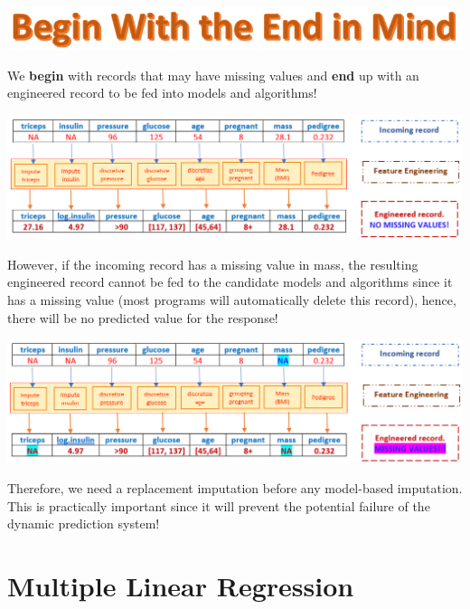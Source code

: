 \documentclass[
]{book}
\begin{document}
\begin{center}\includegraphics[width=0.4\linewidth]{img03/BeginWithEndInMind} \end{center}

\hfill\break

We \textbf{begin} with records that may have missing values and \textbf{end} up with an engineered record to be fed into models and algorithms!

\begin{center}\includegraphics[width=0.95\linewidth]{img03/productionRecord} \end{center}

However, if the incoming record has a missing value in mass, the resulting engineered record cannot be fed to the candidate models and algorithms since it has a missing value (most programs will automatically delete this record), hence, there will be no predicted value for the response!

\begin{center}\includegraphics[width=0.95\linewidth]{img03/PreMeanReplaceRecord} \end{center}

Therefore, we need a replacement imputation before any model-based imputation. This is practically important since it will prevent the potential failure of the dynamic prediction system!

\hypertarget{multiple-linear-regression}{%
\chapter{Multiple Linear Regression}\label{multiple-linear-regression}}
\end{document}
